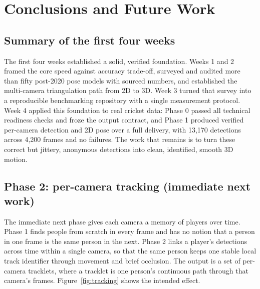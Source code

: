 \documentclass[oneside,openany]{book}
\begin{document}
\chapter{Conclusions and Future Work}
\label{ch:conclusions}

\section{Summary of the first four weeks}
The first four weeks established a solid, verified foundation. Weeks 1 and 2 framed the core
speed against accuracy trade-off, surveyed and audited more than fifty post-2020 pose models with
sourced numbers, and established the multi-camera triangulation path from 2D to 3D. Week 3 turned
that survey into a reproducible benchmarking repository with a single measurement protocol. Week
4 applied this foundation to real cricket data: Phase 0 passed all technical readiness checks and
froze the output contract, and Phase 1 produced verified per-camera detection and 2D pose over a
full delivery, with 13{,}170 detections across 4{,}200 frames and no failures. The work that
remains is to turn these correct but jittery, anonymous detections into clean, identified, smooth
3D motion.

\section{Phase 2: per-camera tracking (immediate next work)}
The immediate next phase gives each camera a memory of players over time. Phase 1 finds people
from scratch in every frame and has no notion that a person in one frame is the same person in
the next. Phase 2 links a player's detections across time within a single camera, so that the
same person keeps one stable local track identifier through movement and brief occlusion. The
output is a set of per-camera tracklets, where a tracklet is one person's continuous path through
that camera's frames. Figure~\ref{fig:tracking} shows the intended effect.
\end{document}
